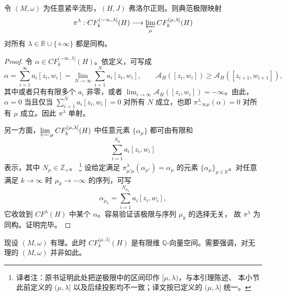 \begin{lemma}
\label{lem:22-filtered-inverse-limit}
令 $(M,\omega)$ 为任意紧辛流形，$(H,J)$ 弗洛尔正则。则典范极限映射
\[
 \pi^\lambda:CF_k^{(-\infty,\lambda]}(H)
 \longrightarrow\varprojlim_{\mu}CF_k^{(\mu,\lambda]}(H)
\]
对所有 $\lambda\in\mathbb R\cup\{+\infty\}$ 都是同构。
\end{lemma}

\begin{proof}
令 $\alpha\in CF_k^{(-\infty,\lambda]}(H)$。依定义，可写成
\[
 \alpha=\sum_{i=1}^\infty a_i[z_i,w_i]
 =\lim_{N\to\infty}\sum_{i=1}^N a_i[z_i,w_i],
 \qquad
 \mathcal A_H([z_i,w_i])\geq\mathcal A_H([z_{i+1},w_{i+1}]),
\]
其中或者只有有限多个 $a_i$ 非零，或者
$\lim_{i\to\infty}\mathcal A_H([z_i,w_i])=-\infty$。由此，$\alpha=0$ 当且仅当
$\sum_{i=1}^N a_i[z_i,w_i]=0$ 对所有 $N$ 成立，也即
$\pi^\lambda_{-\infty\mu}(\alpha)=0$ 对所有 $\mu$ 成立。因此 $\pi^\lambda$ 单射。

另一方面，$\varprojlim_\mu CF_k^{(\mu,\lambda]}(H)$ 中任意元素
$\{\alpha_\mu\}$ 都可由有限和
\[
 \sum_{i=1}^{N_\mu}a_i[z_i,w_i]
\]
表示，其中 $N_\mu\in\mathbb Z_+$。
\footnote{译者注：原书证明此处把逆极限中的区间印作 $[\mu,\lambda)$，与本引理陈述、
本小节此前定义的 $(\mu,\lambda]$ 以及后续投影均不一致；译文按已定义的
$(\mu,\lambda]$ 统一。}
设给定满足
$\pi^\lambda_{\mu'\mu}(\alpha_{\mu'})=\alpha_\mu$ 的元素
$\{\alpha_\mu\}_{\mu\in\mathbb R}$。对任意满足 $k\to\infty$ 时
$\mu_k\to-\infty$ 的序列，可写
\[
 \alpha_{\mu_k}=\sum_{i=1}^{N_{\mu_k}}a_i[z_i,w_i],
\]
它收敛到 $CF^\lambda(H)$ 中某个 $\alpha$。容易验证该极限与序列 $\mu_k$ 的选择无关，
故 $\pi^\lambda$ 为同构。证明完毕。
\end{proof}


\begin{remark}
\label{rem:22-rational-finite-window}
现设 $(M,\omega)$ 有理。此时 $CF_k^{(\mu,\lambda]}(H)$ 是有限维
$\mathbb Q$-向量空间。需要强调，对无理的 $(M,\omega)$ 并非如此。
\end{remark}

